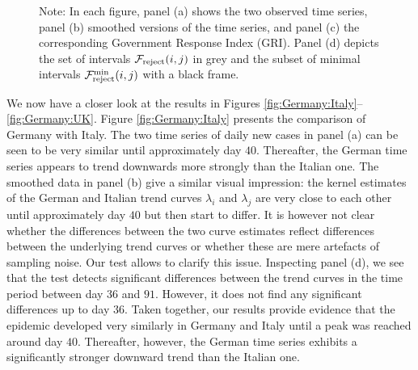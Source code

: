 \documentclass[a4paper,12pt]{article}
\numberwithin{equation}{section}
\begin{document}
\begin{figure}[p!]
\caption*{Note: In each figure, panel (a) shows the two observed time series, panel (b) smoothed versions of the time series, and panel (c) the corresponding Government Response Index (GRI). Panel (d) depicts the set of intervals $\mathcal{F}_{\text{reject}}(i,j)$ in grey and the subset of minimal intervals $\mathcal{F}_{\text{reject}}^{\text{min}}(i,j)$ with a black frame.}
\end{figure}


We now have a closer look at the results in Figures \ref{fig:Germany:Italy}--\ref{fig:Germany:UK}. Figure \ref{fig:Germany:Italy} presents the comparison of Germany with Italy. The two time series of daily new cases in panel (a) can be seen to be very similar until approximately day $40$. Thereafter, the German time series appears to trend downwards more strongly than the Italian one. The smoothed data in panel (b) give a similar visual impression: the kernel estimates of the German and Italian trend curves $\lambda_i$ and $\lambda_j$ are very close to each other until approximately day $40$ but then start to differ. It is however not clear whether the differences between the two curve estimates reflect differences between the underlying trend curves or whether these are mere artefacts of sampling noise. Our test allows to clarify this issue. Inspecting panel (d), we see that the test detects significant differences between the trend curves in the time period between day $36$ and $91$. However, it does not find any significant differences up to day $36$. 
Taken together, our results provide evidence that the epidemic developed very similarly in Germany and Italy until a peak was reached around day $40$. Thereafter, however, the German time series exhibits a significantly stronger downward trend than the Italian one. 
\end{document}
